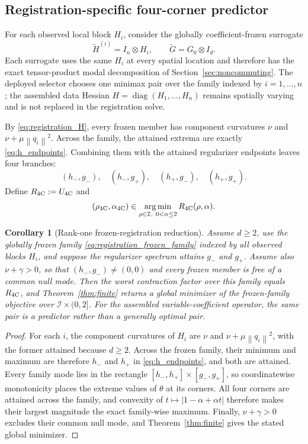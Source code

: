 \documentclass[11pt]{article}
\newtheorem{corollary}[theorem]{Corollary}
\theoremstyle{definition}
\newcommand{\norm}[1]{\left\lVert #1\right\rVert}
\newcommand{\diag}{\operatorname{diag}}
\newcommand{\argmin}{\operatorname*{arg\,min}}
\newcommand{\Ufour}{U_{\mathrm{4C}}}
\begin{document}
\subsection{Registration-specific four-corner predictor}
For each observed local block $H_i$, consider the globally coefficient-frozen
surrogate
\begin{equation}
\widetilde H^{(i)}=I_n\otimes H_i,\qquad
\widetilde G=G_0\otimes I_d.
\label{eq:registration_frozen_family}
\end{equation}
Each surrogate uses the same $H_i$ at every spatial location and therefore has
the exact tensor-product modal decomposition of Section~\ref{sec:noncommuting}.
The deployed selector chooses one minimax pair over the family indexed by
$i=1,\ldots,n$; the assembled data Hessian
$H=\diag(H_1,\ldots,H_n)$ remains spatially varying and is not replaced in the
registration solve.

By \eqref{eq:registration_H}, every frozen member has component curvatures
$\nu$ and $\nu+\mu\norm{q_i}^2$. Across the family, the attained extrema are
exactly \eqref{eq:h_endpoints}. Combining them with the attained regularizer
endpoints leaves four branches:
\[
(h_-,g_-),\quad(h_-,g_+),\quad(h_+,g_-),\quad(h_+,g_+).
\]
Define
$R_{\rm 4C}:=\Ufour$ and
\[
(\rho_{\rm 4C},\alpha_{\rm 4C})
\in\argmin_{\rho\in\mathcal I,\ 0<\alpha\le2}
R_{\rm 4C}(\rho,\alpha).
\]
\begin{corollary}[Rank-one frozen-registration reduction]
\label{cor:registration_fourcorner}
Assume $d\ge2$, use the globally frozen family
\eqref{eq:registration_frozen_family} indexed by all observed blocks $H_i$,
and suppose the regularizer spectrum attains $g_-$ and $g_+$. Assume also
$\nu+\gamma>0$, so that $(h_-,g_-)\ne(0,0)$ and every frozen member is free of
a common null mode. Then the worst contraction factor over this family equals
$R_{\rm 4C}$, and Theorem~\ref{thm:finite} returns a global minimizer of the
frozen-family objective over $\mathcal I\times(0,2]$. For the assembled
variable-coefficient operator, the same pair is a predictor rather than a
generally optimal pair.
\end{corollary}
\begin{proof}
For each $i$, the component curvatures of $H_i$ are $\nu$ and
$\nu+\mu\norm{q_i}^2$, with the former attained because $d\ge2$. Across the
frozen family, their minimum and maximum are therefore $h_-$ and $h_+$ in
\eqref{eq:h_endpoints}, and both are attained. Every family mode lies in the
rectangle $[h_-,h_+]\times[g_-,g_+]$, so coordinatewise monotonicity places
the extreme values of $\theta$ at its corners. All four corners are attained
across the family, and convexity of $t\mapsto|1-\alpha+\alpha t|$ therefore
makes their largest magnitude the exact family-wise maximum. Finally,
$\nu+\gamma>0$ excludes their common null mode, and
Theorem~\ref{thm:finite} gives the stated global minimizer.
\end{proof}
\end{document}
